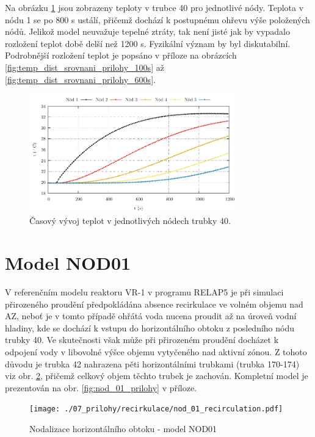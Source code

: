 Na obrázku \ref{fig:nod_00_temp_pipe_40} jsou zobrazeny teploty v trubce 40 pro jednotlivé nódy. Teplota v nódu 1 se po 800 s ustálí, přičemž dochází k postupnému ohřevu výše položených nódů. Jelikož model neuvažuje tepelné ztráty, tak není jisté jak by vypadalo rozložení teplot době delší než 1200 s. Fyzikální význam by byl diskutabilní. Podrobnější rozložení teplot je popsáno v příloze na obrázcích \ref{fig:temp_dist_srovnani_prilohy_100s} až \ref{fig:temp_dist_srovnani_prilohy_600s}.




 
 \begin{figure}[H]
 	\centering
 	\includegraphics[width=0.8\textwidth]{./05_TH_model_VR_1/grafy/t_nod_00.pdf}
 	\caption{Časový vývoj teplot v jednotlivých nódech trubky 40.}
 	\label{fig:nod_00_temp_pipe_40}
 \end{figure}
 \section{Model NOD01}
 \label{sec:nod_01}
V referenčním modelu reaktoru VR-1 v programu RELAP5 je při simulaci přirozeného proudění předpokládána absence recirkulace ve volném objemu nad AZ, neboť je v tomto případě ohřátá voda nucena proudit až na úroveň vodní hladiny, kde se dochází k vstupu do horizontálního obtoku z posledního nódu trubky 40. Ve skutečnosti však může při přirozeném proudění docházet k odpojení vody v libovolné výšce objemu vytyčeného nad aktivní zónou. Z tohoto důvodu je trubka 42 nahrazena pěti horizontálními trubkami (trubka 170-174) viz obr. \ref{fig:nod_01}, přičemž celkový objem těchto trubek je zachován. Kompletní model je prezentován na obr. \ref{fig:nod_01_prilohy} v příloze.

  
 \begin{figure}[H]
 	\centering
 	\texttt{[image: ./07\_prilohy/recirkulace/nod\_01\_recirculation.pdf]}
 	\caption{Nodalizace horizontálního obtoku - model NOD01}
 	\label{fig:nod_01}
 \end{figure}
